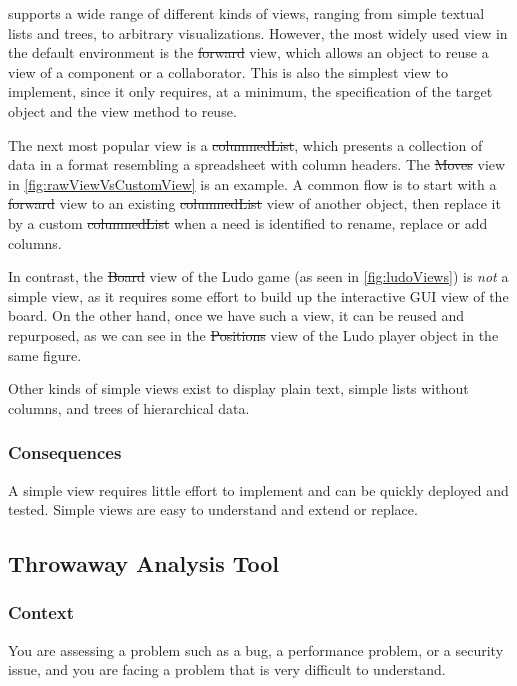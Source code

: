 \documentclass[sigconf]{acmart}
\renewcommand{\nbc}[3]{} %
\newcommand\eog[1]{\nbc{Edward}{#1}{purple}}
\newcommand{\GT}{\lst{GT}\xspace} %
\begin{document}
\GT supports a wide range of different kinds of views, ranging from simple textual lists and trees, to arbitrary visualizations.
However, the most widely used view in the default environment is the \st{forward} view, which allows an object to reuse a view of a component or a collaborator.
This is also the simplest view to implement, since it only requires, at a minimum, the specification of the target object and the view method to reuse.

The next most popular view is a \st{columnedList}, which presents a collection of data in a format resembling a spreadsheet with column headers.
The \st{Moves} view in \autoref{fig:rawViewVsCustomView} is an example.
A common flow is to start with a \st{forward} view to an existing \st{columnedList} view of another object, then replace it by a custom \st{columnedList} when a need is identified to rename, replace or add columns.

\eog{The forward view and the column list.
I think talking about the forward view with just this is hard to digest.
Maybe a picture here would help with other kinds of simple views.}

In contrast, the \st{Board} view of the Ludo game (as seen in \autoref{fig:ludoViews}) is \emph{not} a simple view, as it requires some effort to build up the interactive GUI view of the board.
On the other hand, once we have such a view, it can be reused and repurposed, as we can see in the \st{Positions} view of the Ludo player object in the same figure.

Other kinds of simple views exist to display plain text, simple lists without columns, and trees of hierarchical data.

\subsubsection*{Consequences}
A simple view requires little effort to implement and can be quickly deployed and tested.
Simple views are easy to understand and extend or replace.

\subsection*{Throwaway Analysis Tool}\label{pat:throwawayAnalysisTool}

\subsubsection*{Context}
You are assessing a problem such as a bug, a performance problem, or a security issue, and you are facing a problem that is very difficult to understand.
\end{document}

